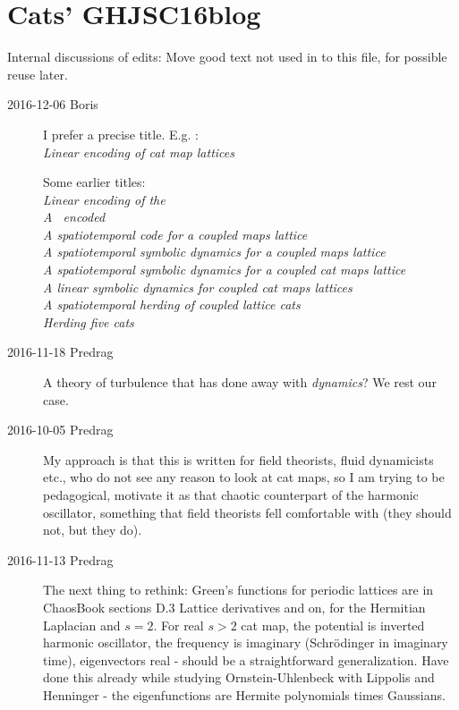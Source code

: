 
\section{Cats' GHJSC16blog}
\label{sect:GHJSC16blog}

Internal discussions of  edits:
Move good text not used in  to this file, for possible
reuse later.

\begin{description}

\item[2016-12-06 Boris] I prefer a precise title.  E.g. :
\\ {\em Linear encoding of cat map lattices}

Some earlier titles:
\\ {\em Linear encoding of the \catlatt} %
\\ {\em A \catlatt\ encoded} %
\\ {\em A spatiotemporal code for a coupled maps lattice} %
\\ {\em A spatiotemporal symbolic dynamics for a coupled maps lattice} %
\\ {\em A spatiotemporal symbolic dynamics for a coupled cat maps lattice} %
\\ {\em A linear symbolic dynamics for coupled cat maps lattices}
\\ {\em A  spatiotemporal herding of coupled lattice cats}
\\ {\em Herding five cats}           %

\item[2016-11-18 Predrag]
A theory of turbulence that has done away with \emph{dynamics}?
We rest our case.

\item[2016-10-05 Predrag]
My approach is that this is written for field theorists, fluid dynamicists
etc., who do not see any reason to look at cat maps, so I am trying to be
pedagogical, motivate it as that chaotic counterpart of the harmonic
oscillator, something that field theorists fell comfortable with (they should
not, but they do).

\item[2016-11-13 Predrag]
The next thing to rethink: Green's functions for periodic lattices are in
ChaosBook sections D.3 Lattice derivatives and on, for the Hermitian
Laplacian and $s=2$. For real $s>2$ cat map, the potential is inverted
harmonic oscillator, the frequency is imaginary (Schr\"odinger in
imaginary time), eigenvectors real - should
be a straightforward generalization. Have done this already while studying
Ornstein-Uhlenbeck with Lippolis and Henninger - the eigenfunctions are
Hermite polynomials times Gaussians.



\end{description}

